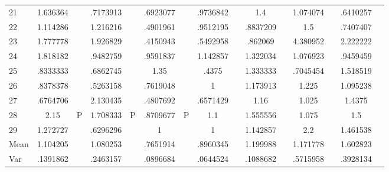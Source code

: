 \documentclass[a4paper,12pt]{article}
\begin{document}
\begin{landscape}
\begin{footnotesize}
\begin{center}
\begin{longtable}{l|cc|cc|cc|cc|cc|cc|cc|}
21&1.636364&&.7173913&&.6923077&&.9736842&&1.4&&1.074074&&.6410257& \\
22&1.114286&&1.216216&&.4901961&&.9512195&&.8837209&&1.5&&.7407407& \\
23&1.777778&&1.926829&&.4150943&&.5492958&&.862069&&4.380952&&2.222222& \\
24&1.818182&&.9482759&&.9591837&&1.142857&&1.322034&&1.076923&&.9459459& \\
25&.8333333&&.6862745&&1.35&&.4375&&1.333333&&.7045454&&1.518519& \\
26&.8378378&&.5263158&&.7619048&&1&&1.173913&&1.225&&1.095238& \\
27&.6764706&&2.130435&&.4807692&&.6571429&&1.16&&1.025&&1.4375& \\
28&2.15&P&1.708333&P&.8709677&P&1.1&&1.555556&&1.075&&1.5& \\
29&1.272727&&.6296296&&1&&1&&1.142857&&2.2&&1.461538& \\ \hline
Mean&1.104205&&1.080253&&.7651914&&.8960345&&1.199988&&1.171778&&1.602823& \\
Var&.1391862&&.2463157&&.0896684&&.0644524&&.1088682&&.5715958&&.3928134& \\ \hline
\end{longtable}
\end{center}
\end{footnotesize}
\end{landscape}
\end{document}
